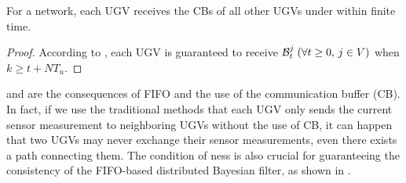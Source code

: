 	

	\begin{cor}\label{cor1}
		For a {\fc} network, each UGV receives the CBs of all other UGVs under {\proto} within finite time. 
	\end{cor}
	\begin{proof}
		According to ,
		each UGV is guaranteed to receive $\mathcal{B}^j_t\; (\forall t\ge 0,\, j\in V)$ when \small$k\geq t+NT_u$\normalsize.
		
	\end{proof}
	
	\begin{rem}
		\textcolor{\revcol}{
		 and  are the consequences of FIFO and the use of the communication buffer (CB). 
		In fact, if we use the traditional methods that each UGV only sends the current sensor measurement to neighboring UGVs without the use of CB, it can happen that two UGVs may never exchange their sensor measurements, even there exists a path connecting them.
		The condition of \fc ness is also crucial for guaranteeing the consistency of the FIFO-based distributed Bayesian filter, as shown in .
	}
	\end{rem}

	
	
